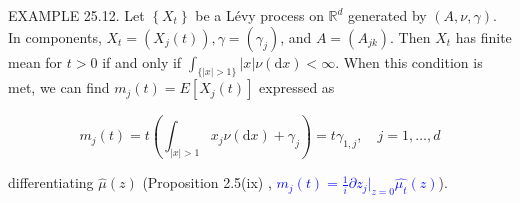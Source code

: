 \documentclass[a4paper,11pt]{article}
\begin{document}
EXAMPLE 25.12. Let $\left\{X_{t}\right\}$ be a Lévy process on $\mathbb{R}^{d}$ generated
by $(A, \nu, \gamma )$. In components, $X_{t}=\left(X_{j}(t)\right), \gamma=\left(\gamma_{j}\right)$,
and $A=\left(A_{j k}\right)$. Then $X_{t}$ has finite mean for $t>0$
if and only if $\int_{\{|x| >1\}} |x| \nu(\mathrm{d} x)<\infty$.
When this condition is met, we can find $m_{j}(t)=E\left[X_{j}(t)\right]$ expressed as


\begin{equation*}
    m_{j}(t)=t\left(\int_{|x|>1} x_{j} \nu(\mathrm{d} x)+\gamma_{j}\right)=t \gamma_{1, j}, \quad j=1, \ldots, d \tag{25.7}
\end{equation*}

differentiating $\widehat{\mu}(z)$ (Proposition 2.5(ix) , \textcolor{blue}{$m_{j}(t) = \frac{1}{i} \partial z_{j}|_{z=0} \widehat{\mu_{t}}(z)$}).
\end{document}
